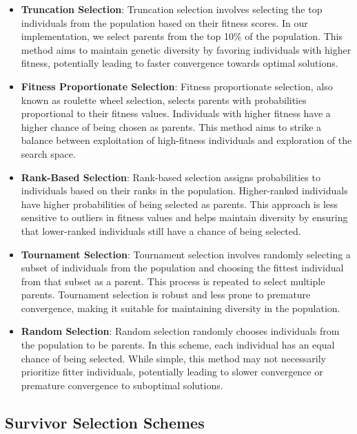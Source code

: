 \begin{itemize}
    \item \textbf{Truncation Selection}: Truncation selection involves selecting the top individuals from the population based on their fitness scores. In our implementation, we select parents from the top 10\% of the population. This method aims to maintain genetic diversity by favoring individuals with higher fitness, potentially leading to faster convergence towards optimal solutions.

    \item \textbf{Fitness Proportionate Selection}: Fitness proportionate selection, also known as roulette wheel selection, selects parents with probabilities proportional to their fitness values. Individuals with higher fitness have a higher chance of being chosen as parents. This method aims to strike a balance between exploitation of high-fitness individuals and exploration of the search space.

    \item \textbf{Rank-Based Selection}: Rank-based selection assigns probabilities to individuals based on their ranks in the population. Higher-ranked individuals have higher probabilities of being selected as parents. This approach is less sensitive to outliers in fitness values and helps maintain diversity by ensuring that lower-ranked individuals still have a chance of being selected.

    \item \textbf{Tournament Selection}: Tournament selection involves randomly selecting a subset of individuals from the population and choosing the fittest individual from that subset as a parent. This process is repeated to select multiple parents. Tournament selection is robust and less prone to premature convergence, making it suitable for maintaining diversity in the population.

    \item \textbf{Random Selection}: Random selection randomly chooses individuals from the population to be parents. In this scheme, each individual has an equal chance of being selected. While simple, this method may not necessarily prioritize fitter individuals, potentially leading to slower convergence or premature convergence to suboptimal solutions.
    
    
\end{itemize}

\subsection{Survivor Selection Schemes}

